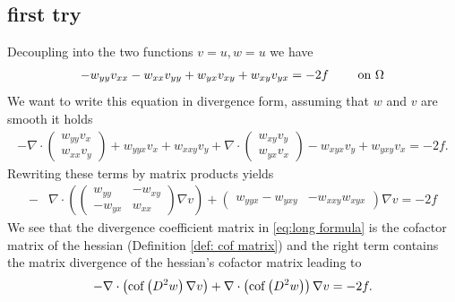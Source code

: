 \subsection*{first try}
Decoupling into the two functions $v = u ,w = u$ we have
\begin{align}
	-w_{yy} v_{xx}-w_{xx} v_{yy} + w_{yx} v_{xy} + w_{xy} v_{yx} = -2f \qquad \textnormal{ on } \Omega \label{eq:decoupled PDE start}
\end{align}
We want to write this equation in divergence form, assuming that $w$ and $v$ are smooth it holds
\begin{align}
	-\nabla \cdot \begin{pmatrix} w_{yy} v_x \\ w_{xx} v_y \end{pmatrix} + w_{yyx}v_x + w_{xxy}v_y
	 +\nabla \cdot \begin{pmatrix} w_{xy} v_y \\ w_{yx} v_x \end{pmatrix}  - w_{xyx}v_y +  w_{yxy}v_x 
	 = -2f.
\end{align}
Rewriting these terms by matrix products yields 
\begin{align}
	       -&\nabla \cdot \left( \begin{pmatrix} w_{yy} & -w_{xy}  \\ -w_{yx} & w_{xx} \end{pmatrix} \nabla v \right) +  \begin{pmatrix} w_{yyx}-w_{yxy} & -w_{xxy} w_{xyx} \end{pmatrix} \nabla v  = -2f  \label{eq:long formula}
\end{align}
We see that the divergence coefficient matrix in \eqref{eq:long formula} is the cofactor matrix of the hessian (Definition \ref{def: cof matrix}) and the right term contains the matrix divergence of the hessian's cofactor matrix leading to
\begin{align}
	-\nabla \cdot \left( \operatorname{cof} \left( D^2 w  \right) \nabla v \right) + \nabla \cdot \left(\operatorname{cof} \left( D^2 w  \right)\right) \nabla v = -2f.
\end{align}
